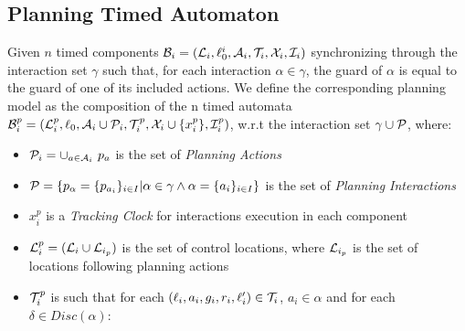

\subsection{Planning Timed Automaton}

\begin{definition}
  \label{def:plan_aut}
  Given $n$ timed components $\mathcal{B}_i=(\mathcal{L}_i,\ell_0^i,\mathcal{A}_i,\mathcal{T}_i,\mathcal{X}_i,\mathcal{I}_i)$ synchronizing 
  through the interaction set  $\gamma$ such that, for each interaction $\alpha\in\gamma$, 
  the guard of $\alpha$ is equal to the guard of one of its included actions.   
  We define the corresponding planning model as the composition of the n timed automata 
  $\mathcal{B}_i^p=(\mathcal{L}_i^p,\ell_0,\mathcal{A}_i\cup\mathcal{P}_i,\mathcal{T}_i^p,\mathcal{X}_i\cup\{x_i^p\},\mathcal{I}_i^p)$,
  w.r.t the interaction set $\gamma\cup\mathcal{P}$, where:
  \begin{itemize}
    \item $\tcal{P}_i=\cup_{a\in\A_i} \ p_{a}$ is the set of \emph{Planning Actions}
    \item $\mathcal{P}=\{p_{\alpha}=\{p_{a_i}\}_{i\in I}|\alpha\in\gamma\wedge\alpha=
      \{a_i\}_{i\in I}\}$ is the set of \emph{Planning Interactions}  
    \item $x_i^p$ is a \emph{Tracking Clock} for interactions execution in each component
    \item $\mathcal{L}_i^{p}=(\mathcal{L}_i\cup\mathcal{L}_{i_p})$ is the set of control locations, where 
      $\mathcal{L}_{i_p}$ is the set of locations following planning actions
    \item $\mathcal{T}_i^p$ is such that for each $(\ell_i,a_i,g_i,r_i,\ell'_i)\in\mathcal{T}_i$, $a_i\in\alpha$ 
      and for each
      $\delta\in Disc(\alpha)$:
\end{itemize}
\end{definition}
